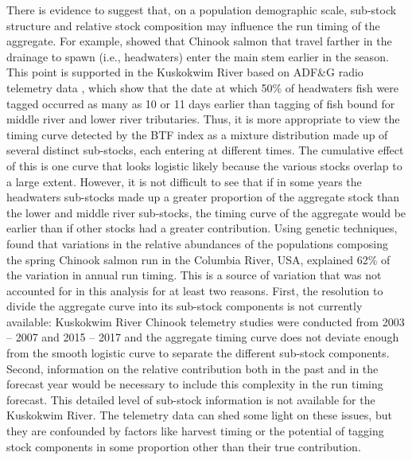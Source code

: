 \documentclass[12pt,]{book}
\theoremstyle{definition}
\theoremstyle{definition}
\theoremstyle{definition}
\theoremstyle{remark}
\begin{document}
There is evidence to suggest that, on a population demographic scale,
sub-stock structure and relative stock composition may influence the run
timing of the aggregate. For example, \citet{clark-etal-2015} showed
that Chinook salmon that travel farther in the drainage to spawn (i.e.,
headwaters) enter the main stem earlier in the season. This point is
supported in the Kuskokwim River based on ADF\&G radio telemetry data
\citep{stuby-2007, smith-liller-2017a, smith-liller-2017b}, which show
that the date at which 50\% of headwaters fish were tagged occurred as
many as 10 or 11 days earlier than tagging of fish bound for middle
river and lower river tributaries. Thus, it is more appropriate to view
the timing curve detected by the BTF index as a mixture distribution
made up of several distinct sub-stocks, each entering at different
times. The cumulative effect of this is one curve that looks logistic
likely because the various stocks overlap to a large extent. However, it
is not difficult to see that if in some years the headwaters sub-stocks
made up a greater proportion of the aggregate stock than the lower and
middle river sub-stocks, the timing curve of the aggregate would be
earlier than if other stocks had a greater contribution. Using genetic
techniques, \citet{anderson-beer-2009} found that variations in the
relative abundances of the populations composing the spring Chinook
salmon run in the Columbia River, USA, explained 62\% of the variation
in annual run timing. This is a source of variation that was not
accounted for in this analysis for at least two reasons. First, the
resolution to divide the aggregate curve into its sub-stock components
is not currently available: Kuskokwim River Chinook telemetry studies
were conducted from 2003 -- 2007 and 2015 -- 2017 and the aggregate
timing curve does not deviate enough from the smooth logistic curve to
separate the different sub-stock components. Second, information on the
relative contribution both in the past and in the forecast year would be
necessary to include this complexity in the run timing forecast. This
detailed level of sub-stock information is not available for the
Kuskokwim River. The telemetry data can shed some light on these issues,
but they are confounded by factors like harvest timing \citep[some
stocks may be harvested preferentially purely due to the timing of the
fishery, which does not mirror that of the aggregate
run;][]{hamazaki-2008} or the potential of tagging stock components in
some proportion other than their true contribution.
\end{document}
